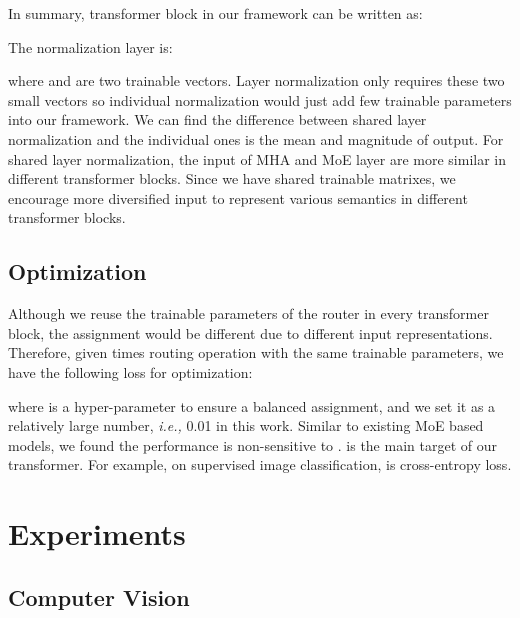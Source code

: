 \documentclass[letterpaper]{article} \usepackage{aaai22}  \usepackage{times}  \usepackage{helvet}  \usepackage{courier}  \usepackage[hyphens]{url}  \usepackage{graphicx} \urlstyle{rm} \def\UrlFont{\rm}  \usepackage{natbib}  \usepackage{caption} \DeclareCaptionStyle{ruled}{labelfont=normalfont,labelsep=colon,strut=off} \frenchspacing  \setlength{\pdfpagewidth}{8.5in}  \setlength{\pdfpageheight}{11in}  \usepackage{algorithm}
\newcommand{\ie}{\emph{i.e.,}\xspace}
\begin{document}
In summary,  transformer block in our framework can be written as:

The normalization layer  is:


where  and  are two trainable vectors. Layer normalization only requires these two small vectors so individual normalization would just add few trainable parameters into our framework. We can find the difference between shared layer normalization and the individual ones is the mean and magnitude of output. For shared layer normalization, the input of MHA and MoE layer are more similar in different transformer blocks. Since we have shared trainable matrixes, we encourage more diversified input to represent various semantics in different transformer blocks. 


\subsection{Optimization}



Although we reuse the trainable parameters of the router in every transformer block, the assignment would be different due to different input representations. Therefore, given  times routing operation with the same trainable parameters, we have the following loss for optimization:


where  is a hyper-parameter to ensure a balanced assignment, and we set it as a relatively large number, \ie 0.01 in this work. Similar to existing MoE based models, we found the performance is non-sensitive to .  is the main target of our transformer. For example, on supervised image classification,  is cross-entropy loss.





\section{Experiments}
\label{sec:experiments}










\subsection{Computer Vision}
\label{sec:cv}
\end{document}
